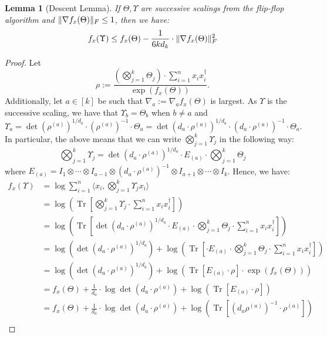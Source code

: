 \documentclass{article}
\newtheorem{lemma}[theorem]{Lemma}
\DeclarePairedDelimiter{\norm}{\lVert}{\rVert}
\newcommand\tr{\operatorname{Tr}}
\begin{document}
\begin{lemma}[Descent Lemma]\label{lem:tensor-descent-lemma}
	If $\Theta, \Upsilon$ are successive scalings from the flip-flop algorithm and $\norm{\nabla f_x(\Theta)}_F \leq 1$, then we have:
	$$ f_x(\Upsilon) \leq f_x(\Theta) - \dfrac{1}{6k d_k} \cdot \norm{\nabla f_x(\Theta)}_F^2 $$
\end{lemma}

\begin{proof}
	Let 
	$$\rho := \dfrac{\left( \bigotimes_{j=1}^k \Theta_j \right) \cdot \sum_{i=1}^n x_i x_i^\dagger}{\exp(f_x(\Theta))}.$$
	Additionally, let $a \in [k]$ be such that $\nabla_a := \nabla_a f_x(\Theta)$ is largest. As $\Upsilon$ is the successive scaling, we have that $\Upsilon_b = \Theta_b$ when $b \neq a$ and 
	$$ \Upsilon_a = \det(\rho^{(a)})^{1/d_a} \cdot (\rho^{(a)})^{-1} \cdot \Theta_a = \det(d_a \cdot \rho^{(a)})^{1/d_a} \cdot (d_a \cdot \rho^{(a)})^{-1} \cdot \Theta_a. $$
	In particular, the above means that we can write $\bigotimes_{j=1}^k \Upsilon_j$ in the following way:
	$$ \bigotimes_{j=1}^k \Upsilon_j = \det(d_a \cdot \rho^{(a)})^{1/d_a} \cdot E_{(a)} \cdot \bigotimes_{j=1}^k \Theta_j $$
	where $E_{(a)} = I_1 \otimes \cdots \otimes I_{a-1} \otimes (d_a \cdot \rho^{(a)})^{-1} \otimes I_{a+1} \otimes \cdots \otimes I_k$.
	Hence, we have:
	\begin{align*}
		f_x(\Upsilon) &= \log \sum_{i=1}^n \langle x_i , \bigotimes_{j=1}^k \Upsilon_j x_i \rangle \\
		&= \log\left(\tr\left[ \bigotimes_{j=1}^k \Upsilon_j \cdot  \sum_{i=1}^n x_i x_i^\dagger  \right]\right) \\ 
		&= \log\left(\tr\left[ \det(d_a \cdot \rho^{(a)})^{1/d_a} \cdot E_{(a)} \cdot \bigotimes_{j=1}^k \Theta_j \cdot  \sum_{i=1}^n x_i x_i^\dagger  \right]\right) \\
		&= \log\left(\det(d_a \cdot \rho^{(a)})^{1/d_a} \right) +  \log\left(\tr\left[ \cdot E_{(a)} \cdot \bigotimes_{j=1}^k \Theta_j \cdot  \sum_{i=1}^n x_i x_i^\dagger  \right]\right) \\
		&= \log\left(\det(d_a \cdot \rho^{(a)})^{1/d_a} \right) +  \log\left(\tr\left[ E_{(a)} \cdot \rho \right] \cdot \exp(f_x(\Theta)) \right) \\
		&= f_x(\Theta) + \frac{1}{d_a} \cdot  \log\det(d_a \cdot \rho^{(a)})  +  \log\left(\tr\left[ E_{(a)} \cdot \rho \right] \right) \\
		&= f_x(\Theta) + \frac{1}{d_a} \cdot  \log\det(d_a \cdot \rho^{(a)})  +  \log\left(\tr\left[ (d_a \rho^{(a)})^{-1} \cdot \rho^{(a)} \right] \right) \\

\end{align*}
\end{proof}
\end{document}
